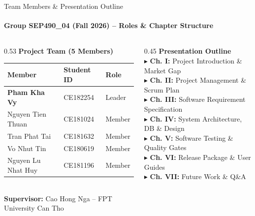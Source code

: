 \documentclass[aspectratio=169,11pt]{beamer}
\newcommand{\bul}[1]{\textcolor{fptaccent}{$\blacktriangleright$} #1}
\begin{document}
\begin{frame}[t]{Team Members \& Presentation Outline}
  \framesubtitle{Group SEP490\_04 (Fall 2026) -- Roles \& Chapter Structure}
  \begin{columns}[T]
    \begin{column}{0.53\textwidth}
      \textcolor{fptteal}{\textbf{Project Team (5 Members)}}\\[6pt]
      \renewcommand{\arraystretch}{1.35}
      \fontsize{8.3}{10.5}\selectfont
      \begin{tabular}{@{}l l l@{}}
        \toprule
        \textcolor{fptaccent}{\textbf{Member}} & \textcolor{fptaccent}{\textbf{Student ID}} & \textcolor{fptaccent}{\textbf{Role}} \\
        \midrule
        \textbf{Pham Kha Vy} & CE182254 & Leader \\
        Nguyen Tien Thuan & CE181024 & Member \\
        Tran Phat Tai & CE181632 & Member \\
        Vo Nhut Tin & CE180619 & Member \\
        Nguyen Lu Nhat Huy & CE181196 & Member \\
        \bottomrule
      \end{tabular}\\[10pt]
      \textcolor{mutedgray}{\footnotesize\textbf{Supervisor:} Cao Hong Nga -- FPT University Can Tho}
    \end{column}
    \begin{column}{0.45\textwidth}
      \textcolor{fptteal}{\textbf{Presentation Outline}}\\[6pt]
      \fontsize{9.5}{14}\selectfont
      \bul{\textbf{Ch. I:} Project Introduction \& Market Gap}\\[4pt]
      \bul{\textbf{Ch. II:} Project Management \& Scrum Plan}\\[4pt]
      \bul{\textbf{Ch. III:} Software Requirement Specification}\\[4pt]
      \bul{\textbf{Ch. IV:} System Architecture, DB \& Design}\\[4pt]
      \bul{\textbf{Ch. V:} Software Testing \& Quality Gates}\\[4pt]
      \bul{\textbf{Ch. VI:} Release Package \& User Guides}\\[4pt]
      \bul{\textbf{Ch. VII:} Future Work \& Q\&A}
    \end{column}
  \end{columns}
\end{frame}
\end{document}
